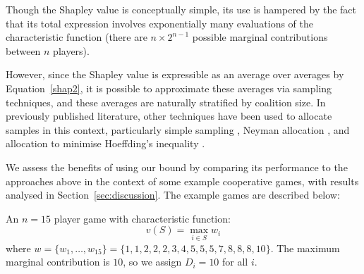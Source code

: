 Though the Shapley value is conceptually simple, its use is hampered by the fact that its total expression involves exponentially many evaluations of the characteristic function (there are $n\times 2^{n-1}$ possible marginal contributions between $n$ players).

However, since the Shapley value is expressible as an average over averages by Equation~\eqref{shap2}, 
it is possible to approximate these averages via sampling techniques, and these averages are naturally stratified by coalition size.
In previously published literature, other techniques have been used to allocate samples in this context, particularly simple sampling \citep{DBLP:journals/cor/CastroGT09}, Neyman allocation \citep{CASTRO2017180,DBLP:journals/tsg/OBrienGR15}, and allocation to minimise Hoeffding's inequality \citep{2013arXiv1306.4265M}.

We assess the benefits of using our bound by comparing its performance to the approaches above in the context of some example cooperative games, with results analysed in Section~\ref{sec:discussion}.
The example games are described below:

\begin{example_game}
An $n=15$ player game with characteristic function:
$$v(S)=\max_{i\in S}w_i$$
where
$w=\{w_1,\dots,w_{15}\} %
=\{ 1, 1, 2, 2, 2, 3, 4, 5, 5, 5, 7, 8, 8, 8, 10\}$.
The maximum marginal contribution is $10$, so we assign $D_i=10$ for all $i$.
\end{example_game}

